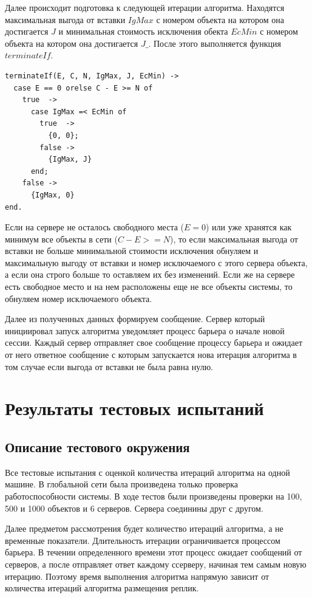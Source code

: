 			Далее происходит подготовка к следующей итерации алгоритма. Находятся максимальная выгода от вставки $IgMax$ с номером объекта на котором она достигается $J$ и минимальная стоимость 
			исключения обекта $EcMin$ с номером объекта на котором она достигается $J\_$. После этого выполняется функция $terminateIf$.
			\begin{lstlisting}
terminateIf(E, C, N, IgMax, J, EcMin) ->
  case E == 0 orelse C - E >= N of
    true  -> 
      case IgMax =< EcMin of
        true  -> 
          {0, 0};
        false -> 
          {IgMax, J}
      end;
    false -> 
      {IgMax, 0}
end.	
			\end{lstlisting}
			Если на сервере не осталось свободного места ($E = 0$) или уже хранятся как минимум все объекты в сети ($C - E >= N$), то если максимальная выгода от вставки не больше минимальной 
			стоимости исключения обнуляем и максимальную выгоду от вставки и номер исключаемого с этого сервера объекта, а если она строго больше то оставляем их без изменений.
			Если же на сервере есть свободное место и на нем расположены еще не все объекты системы, то обнуляем номер исключаемого объекта. 
			
			Далее из полученных данных формируем сообщение. Сервер который инициировал запуск алгоритма уведомляет процесс барьера о начале новой сессии. Каждый сервер отправляет свое
			сообщение процессу барьера  и ожидает от него ответное сообщение с которым запускается нова итерация алгоритма в том случае если выгода от вставки не была равна нулю.


			
\chapter{Результаты тестовых испытаний}
	\section{Описание тестового окружения}
		Все тестовые испытания с оценкой количества итераций алгоритма на одной машине. В глобальной сети была произведена только проверка работоспособности системы. В ходе тестов были 
		произведены проверки на 100, 500 и 1000 объектов и 6 серверов. Сервера соединины друг с другом. 

		Далее предметом рассмотрения будет количество итераций алгоритма, а не временные показатели. Длительность итерации ограничивается процессом барьера. В течении определенного времени
		этот процесс ожидает сообщений от серверов, а после отправляет ответ каждому ссерверу, начиная тем самым новую итерацию. Поэтому время выполнения алгоритма напрямую зависит от 
		количества итераций алгоритма размещения реплик.
		
